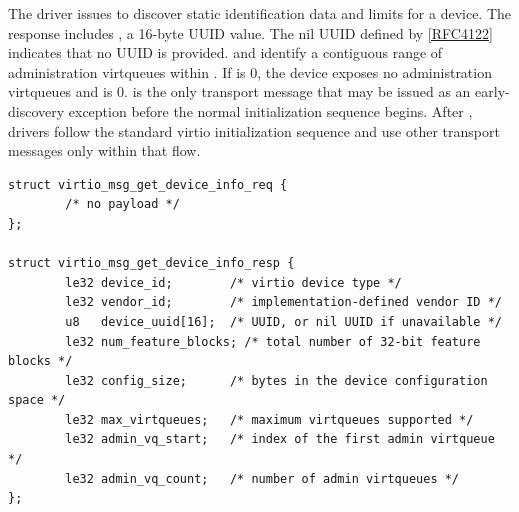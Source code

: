 
The driver issues  to discover static identification
data and limits for a device. The response includes , a
16-byte UUID value. The nil UUID defined by
\hyperref[intro:rfc4122]{[RFC4122]} indicates that no UUID is provided.
 and  identify a contiguous range
of administration virtqueues within . If
 is 0, the device exposes no administration virtqueues
and  is 0.
 is the only transport message that may be issued as an
early-discovery exception before the normal initialization sequence begins.
After , drivers follow the standard virtio
initialization sequence and use other transport messages only within that flow.

\begin{lstlisting}
struct virtio_msg_get_device_info_req {
        /* no payload */
};

struct virtio_msg_get_device_info_resp {
        le32 device_id;        /* virtio device type */
        le32 vendor_id;        /* implementation-defined vendor ID */
        u8   device_uuid[16];  /* UUID, or nil UUID if unavailable */
        le32 num_feature_blocks; /* total number of 32-bit feature blocks */
        le32 config_size;      /* bytes in the device configuration space */
        le32 max_virtqueues;   /* maximum virtqueues supported */
        le32 admin_vq_start;   /* index of the first admin virtqueue */
        le32 admin_vq_count;   /* number of admin virtqueues */
};
\end{lstlisting}

